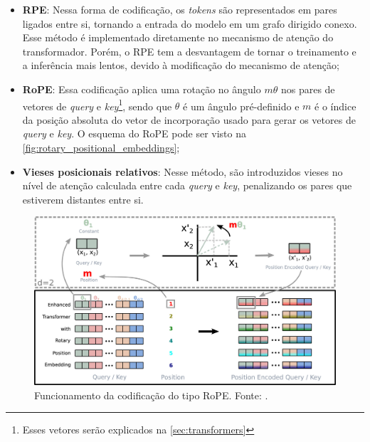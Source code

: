 \begin{itemize}
      \item \textbf{\ac{RPE}}: Nessa forma de codificação, os \textit{tokens} são representados em pares ligados entre si, tornando a entrada do modelo em um grafo
            dirigido conexo. Esse método é implementado diretamente no mecanismo de atenção do transformador. Porém, o \ac{RPE} tem a desvantagem de tornar o treinamento
            e a inferência mais lentos, devido à modificação do mecanismo de atenção;
      \item \textbf{\ac{RoPE}}: Essa codificação aplica uma rotação no ângulo \begin{math}m\theta\end{math} nos pares de vetores de
            \textit{query} e \textit{key}\footnote{Esses vetores serão explicados na \autoref{sec:transformers}}, sendo que \begin{math}\theta\end{math} é um ângulo
            pré-definido e \begin{math}m\end{math} é o índice da posição absoluta do vetor de incorporação usado para gerar os vetores de \textit{query} e \textit{key}. O
            esquema do \ac{RoPE} pode ser visto na \autoref{fig:rotary_positional_embeddings};
      \item \textbf{Vieses posicionais relativos}: Nesse método, são introduzidos vieses no nível de atenção calculada entre cada \textit{query} e \textit{key},
            penalizando os pares que estiverem distantes entre si.
\end{itemize}

\begin{figure}[ht]
      \centering
      \includegraphics[width=0.8\columnwidth,keepaspectratio]{images/rotary_positional_embeddings.jpg}
      \caption{Funcionamento da codificação do tipo \ac{RoPE}. Fonte: \textcite{su2024roformer}.}
      \label{fig:rotary_positional_embeddings}
\end{figure}

